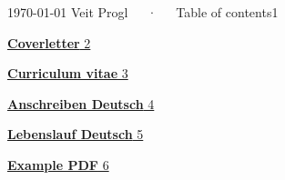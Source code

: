 \documentclass[ngerman, 11pt, a4paper]{awesome-cv}
\begin{document}
\makecvheader[R]

\makecvfooter
  {\today}
  {Veit Progl~~~·~~~Table of contents}1
  {}

\makelettertitle

\begin{cvletter}


\hyperlink{page.2}{
\textbf{Coverletter}
\hfill
2 \\
}

\hyperlink{page.3}{
\textbf{Curriculum vitae}
\hfill
3 \\
}

\hyperlink{page.4}{
\textbf{Anschreiben Deutsch}
\hfill
4 \\
}

\hyperlink{page.5}{
\textbf{Lebenslauf Deutsch}
\hfill
5 \\
}

\hyperlink{page.6}{
\textbf{Example PDF}
\hfill
6 \\
}




\end{cvletter}










\end{document}

